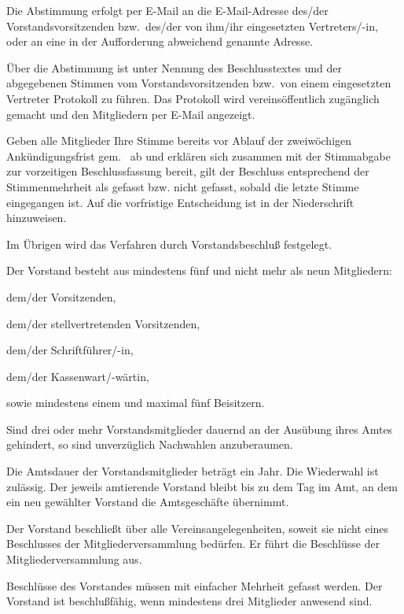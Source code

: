 \documentclass[draft]{scrartcl}
\begin{document}
\begin{contract}
Die Abstimmung erfolgt per E-Mail an die E-Mail-Adresse des/der
Vorstandsvorsitzenden bzw.\ des/der von ihm/ihr eingesetzten Vertreters/-in,
oder an eine in der Auf\/forderung abweichend genannte Adresse.

Über die Abstimmung ist unter Nennung des Beschlusstextes und der abgegebenen
Stimmen vom Vorstandsvorsitzenden bzw.\ von einem eingesetzten Vertreter
Protokoll zu führen. Das Protokoll wird vereinsöffentlich zugänglich gemacht
und den Mitgliedern per E-Mail angezeigt.

Geben alle Mitglieder Ihre Stimme bereits vor Ablauf der zweiwöchigen
An\-kün\-di\-gungs\-frist gem.~ ab und erklären sich
zusammen mit der Stimmabgabe zur vorzeitigen Beschlussfassung bereit, gilt der
Beschluss entsprechend der Stimmenmehrheit als gefasst bzw. nicht gefasst, sobald
die letzte Stimme eingegangen ist. Auf die vorfristige Entscheidung ist in der
Niederschrift hinzuweisen.

Im Übrigen wird das Verfahren durch Vorstandsbeschluß festgelegt.


Der Vorstand besteht aus mindestens fünf und nicht mehr als neun Mitgliedern:
\begin{compactenum}[\hspace{2em}1.]
  \item dem/der Vorsitzenden,
  \item dem/der stellvertretenden Vorsitzenden,
  \item dem/der Schriftführer/-in,
  \item dem/der Kassenwart/-wärtin,
  \item sowie mindestens einem und maximal fünf Beisitzern.
\end{compactenum}

Sind drei oder mehr Vorstandsmitglieder dauernd an der Ausübung ihres Amtes
gehindert, so sind unverzüglich Nachwahlen anzuberaumen.

Die Amtsdauer der Vorstandsmitglieder beträgt ein Jahr. Die Wiederwahl ist
zulässig. Der jeweils amtierende Vorstand bleibt bis zu dem Tag im Amt, an dem
ein neu gewählter Vorstand die Amtsgeschäfte übernimmt.

Der Vorstand beschließt über alle Vereinsangelegenheiten, soweit sie nicht
eines Beschlusses der Mitgliederversammlung bedürfen. Er führt die Beschlüsse
der Mitgliederversammlung aus.

Beschlüsse des Vorstandes müssen mit einfacher Mehrheit gefasst werden. Der
Vorstand ist beschlußfähig, wenn mindestens drei Mitglieder anwesend sind.


\end{contract}
\end{document}

